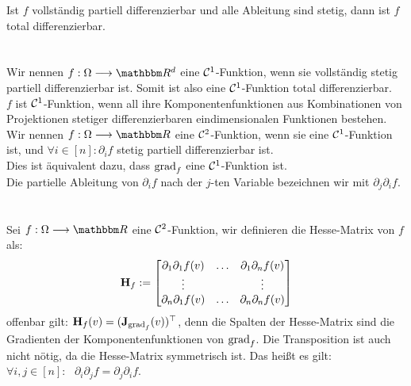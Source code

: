 Ist \(f\) vollständig partiell differenzierbar und alle Ableitung sind stetig, dann ist \(f\) total differenzierbar. \\ \\
 \\
Wir nennen \(f: \Omega \longrightarrow \R^d\) eine \(\mathcal C^1\)-Funktion, wenn sie vollständig stetig partiell differenzierbar ist. Somit ist also eine \(\mathcal C^1\)-Funktion total differenzierbar. \\
\(f\) ist \(\mathcal C^1\)-Funktion, wenn all ihre Komponentenfunktionen aus Kombinationen von Projektionen stetiger differenzierbaren eindimensionalen Funktionen bestehen. \\
Wir nennen \(f: \Omega \longrightarrow \R\) eine \(\mathcal C^2\)-Funktion, wenn sie eine \(\mathcal C^1\)-Funktion ist, und \(\forall i \in [n]: \partial_if\) stetig partiell differenzierbar ist. \\
Dies ist äquivalent dazu, dass \(\text{grad}_f\) eine \(\mathcal C^1\)-Funktion ist. \\Die partielle
Ableitung von \(\partial_i f\) nach der \(j\)-ten Variable bezeichnen wir mit \(\partial_j\partial_if\). \\ \\
 \\
Sei \(f: \Omega \longrightarrow \R\) eine \(\mathcal C^2\)-Funktion, wir definieren die Hesse-Matrix von \(f\) als: \[\textbf{H}_f := \begin{bmatrix}
    \partial_1\partial_1f(v) & \hdots & \partial_1\partial_nf(v) \\
    \vdots & & \vdots \\
    \partial_n\partial_1f(v) & \hdots & \partial_n\partial_nf(v)
\end{bmatrix}\] offenbar gilt: \(\textbf{H}_f(v) = (\textbf{J}_{\text{grad}_f}(v))^{\top}\), denn die Spalten der Hesse-Matrix sind die
Gradienten der Komponentenfunktionen von \(\text{grad}_f\).
Die Transposition ist auch nicht nötig, da die Hesse-Matrix symmetrisch ist. Das heißt es gilt: \(\forall i,j\in[n]{:}\text{ } \partial_i\partial_jf = \partial_j\partial_if\).
